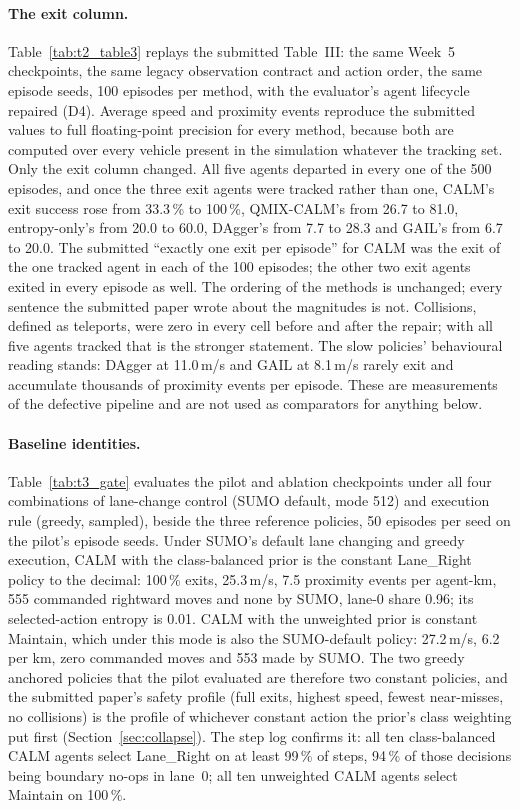 \paragraph{The exit column.}
Table~\ref{tab:t2_table3} replays the submitted Table~III: the same Week~5 checkpoints, the same legacy observation contract and action order, the same episode seeds, 100 episodes per method, with the evaluator's agent lifecycle repaired (D4). Average speed and proximity events reproduce the submitted values to full floating-point precision for every method, because both are computed over every vehicle present in the simulation whatever the tracking set. Only the exit column changed. All five agents departed in every one of the 500 episodes, and once the three exit agents were tracked rather than one, CALM's exit success rose from 33.3\,\% to 100\,\%, QMIX-CALM's from 26.7 to 81.0, entropy-only's from 20.0 to 60.0, DAgger's from 7.7 to 28.3 and GAIL's from 6.7 to 20.0. The submitted ``exactly one exit per episode'' for CALM was the exit of the one tracked agent in each of the 100 episodes; the other two exit agents exited in every episode as well. The ordering of the methods is unchanged; every sentence the submitted paper wrote about the magnitudes is not. Collisions, defined as teleports, were zero in every cell before and after the repair; with all five agents tracked that is the stronger statement. The slow policies' behavioural reading stands: DAgger at 11.0\,m/s and GAIL at 8.1\,m/s rarely exit and accumulate thousands of proximity events per episode. These are measurements of the defective pipeline and are not used as comparators for anything below.

\paragraph{Baseline identities.}
Table~\ref{tab:t3_gate} evaluates the pilot and ablation checkpoints under all four combinations of lane-change control (SUMO default, mode 512) and execution rule (greedy, sampled), beside the three reference policies, 50 episodes per seed on the pilot's episode seeds. Under SUMO's default lane changing and greedy execution, CALM with the class-balanced prior is the constant Lane\_Right policy to the decimal: 100\,\% exits, 25.3\,m/s, 7.5 proximity events per agent-km, 555 commanded rightward moves and none by SUMO, lane-0 share 0.96; its selected-action entropy is 0.01. CALM with the unweighted prior is constant Maintain, which under this mode is also the SUMO-default policy: 27.2\,m/s, 6.2 per km, zero commanded moves and 553 made by SUMO. The two greedy anchored policies that the pilot evaluated are therefore two constant policies, and the submitted paper's safety profile (full exits, highest speed, fewest near-misses, no collisions) is the profile of whichever constant action the prior's class weighting put first (Section~\ref{sec:collapse}). The step log confirms it: all ten class-balanced CALM agents select Lane\_Right on at least 99\,\% of steps, 94\,\% of those decisions being boundary no-ops in lane~0; all ten unweighted CALM agents select Maintain on 100\,\%.


